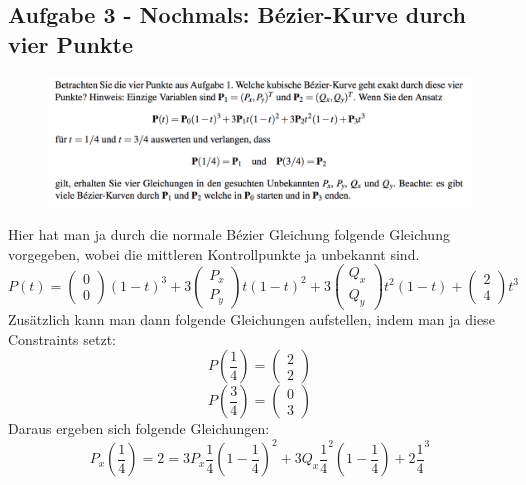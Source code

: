 \subsection{Aufgabe 3 - Nochmals: Bézier-Kurve durch vier Punkte}
\begin{figure}[!ht]
	\centering
	\includegraphics[width=1.0\linewidth]{fig/ueb_curves_3}
\end{figure}
Hier hat man ja durch die normale Bézier Gleichung folgende Gleichung vorgegeben, wobei die mittleren Kontrollpunkte ja unbekannt sind.
\begin{displaymath}
P(t) =  \begin{pmatrix}0 \\ 0\end{pmatrix} (1-t)^3 + 3 \begin{pmatrix}P_x \\ P_y\end{pmatrix}t(1-t)^2+3 \begin{pmatrix}Q_x \\ Q_y\end{pmatrix}t^2(1-t)+ \begin{pmatrix}2 \\ 4\end{pmatrix}t^3
\end{displaymath}
Zusätzlich kann man dann folgende Gleichungen aufstellen, indem man ja diese Constraints setzt:
\begin{displaymath}
P\left(\frac{1}{4}\right) =  \begin{pmatrix}2 \\ 2\end{pmatrix}
\end{displaymath}
\begin{displaymath}
P\left(\frac{3}{4}\right) =  \begin{pmatrix}0 \\ 3\end{pmatrix}
\end{displaymath}
Daraus ergeben sich folgende Gleichungen:
\begin{displaymath}
P_x\left(\frac{1}{4}\right) = 2 = 3 P_x \frac{1}{4}\left(1-\frac{1}{4}\right)^2+3Q_x\frac{1}{4}^2\left(1-\frac{1}{4}\right)+2\frac{1}{4}^3
\end{displaymath}

